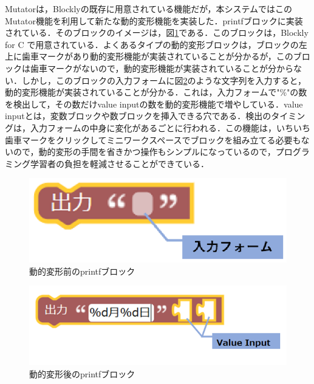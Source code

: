 \documentclass{risepaper}
\begin{document}
Mutatorは，Blocklyの既存に用意されている機能だが，本システムではこのMutator機能を利用して新たな動的変形機能を実装した．printfブロックに実装されている．そのブロックのイメージは，図\ref{fig:output}である．このブロックは，Blockly for C で用意されている．よくあるタイプの動的変形ブロックは，ブロックの左上に歯車マークがあり動的変形機能が実装されていることが分かるが，このブロックは歯車マークがないので，動的変形機能が実装されていることが分からない．しかし，このブロックの入力フォームに図\ref{fig:output2}のような文字列を入力すると，動的変形機能が実装されていることが分かる．これは，入力フォームで"\%"の数を検出して，その数だけvalue inputの数を動的変形機能で増やしている．value inputとは，変数ブロックや数ブロックを挿入できる穴である．検出のタイミングは，入力フォームの中身に変化があるごとに行われる．この機能は，いちいち歯車マークをクリックしてミニワークスペースでブロックを組み立てる必要もないので，動的変形の手間を省きかつ操作もシンプルになっているので，プログラミング学習者の負担を軽減させることができている．

\begin{figure}[h]
\begin{center}
\includegraphics[scale=0.5]{img/output.eps}
\caption{動的変形前のprintfブロック}%
\label{fig:output}
\end{center}%
\end{figure}%

\begin{figure}[h]
\begin{center}
\includegraphics[scale=0.5]{img/output2.png}
\caption{動的変形後のprintfブロック}%
\label{fig:output2}
\end{center}%
\end{figure}%
\end{document}
